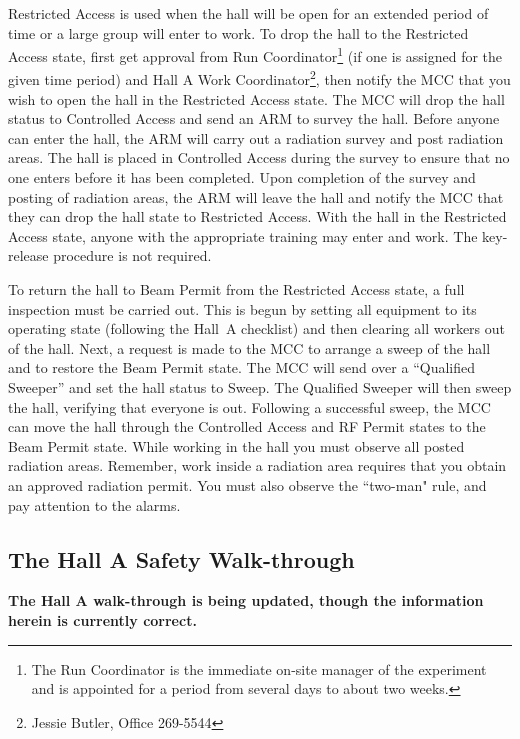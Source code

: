 {Restricted Access is used when the hall will be open for an extended
period of time or a large group will enter to work. 
To drop the hall
to the Restricted Access state, first get approval from Run 
Coordinator\footnote{The Run Coordinator is the immediate on-site
manager of the experiment and is appointed for a period from
several days to about two weeks.}
(if one is assigned for the given time period)
and Hall A Work Coordinator\footnote{Jessie Butler, Office 269-5544},
then notify the MCC that you wish to
open the hall in the Restricted Access state. The MCC will drop the
hall status to Controlled Access and send an ARM to survey the
hall. Before anyone can enter the hall, the ARM will carry out a
radiation survey and post radiation areas.  The hall is placed in
Controlled Access during the survey to ensure that no one enters
before it has been completed. Upon completion of the survey and
posting of radiation areas, the ARM will leave the hall and notify the
MCC that they can drop the hall state to Restricted Access. With the
hall in the Restricted Access state, anyone with the appropriate
training may enter and work.  The key- release procedure is not
required.
 
To return the hall to Beam Permit from the Restricted Access state, a
full inspection must be carried out. This is begun by setting all
equipment to its operating state (following the Hall~A checklist) and
then clearing all workers out of the hall. Next, a request is made to
the MCC to arrange a sweep of the hall and to restore the Beam Permit
state. The MCC will send over a ``Qualified Sweeper'' and set the hall status to Sweep.
The Qualified Sweeper will then sweep the hall, verifying that everyone is
out. Following a successful sweep, the MCC can move the hall through
the Controlled Access and RF Permit states to the Beam Permit state.
While working in the hall you must observe all posted radiation areas.
Remember, work inside a radiation area requires that you obtain an
approved radiation permit. You must also observe the ``two-man" rule,
and pay attention to the alarms.

\begin{safetyen}{0}{0}
\subsection{The Hall A Safety Walk-through}
\end{safetyen}

{\bf{The Hall A walk-through is being updated, though the information
herein is currently correct.}

}}
